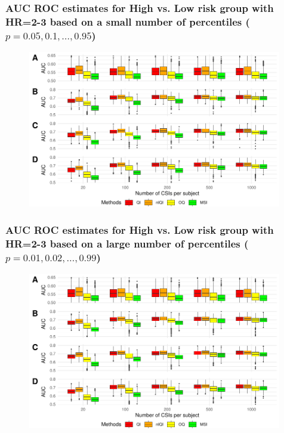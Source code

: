 \documentclass[t,8pt]{beamer}
\begin{document}
\frame
   {\frametitle{AUC ROC estimates for High vs. Low risk group with HR=2-3 based on a small number of percentiles ($p=0.05, 0.1, \dots, 0.95$) }  
    	\begin{figure}
	  \includegraphics[height=2.7in] {Figures/Figures_simulations/AUC.box.plots nQ 19HRlabel2-3 pairedsimID 1000.pdf}
	\end{figure}  
}

\frame
   {\frametitle{AUC ROC estimates for High vs. Low risk group with HR=2-3 based on a large number of percentiles ($p=0.01, 0.02, \dots, 0.99$)}  
    	\begin{figure}
	  \includegraphics[height=2.7in] {Figures/Figures_simulations/AUC.box.plots nQ 99HRlabel2-3 pairedsimID 1000.pdf}
	\end{figure}  
}
\end{document}
